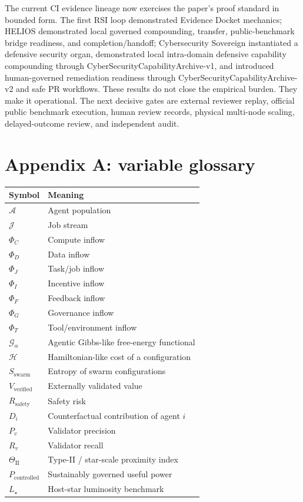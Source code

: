 The current CI evidence lineage now exercises the paper's proof standard
in bounded form. The first RSI loop demonstrated Evidence Docket
mechanics; HELIOS demonstrated local governed compounding, transfer,
public-benchmark bridge readiness, and completion/handoff; Cybersecurity
Sovereign instantiated a defensive security organ, demonstrated local
intra-domain defensive capability compounding through
CyberSecurityCapabilityArchive-v1, and introduced human-governed
remediation readiness through CyberSecurityCapabilityArchive-v2 and safe
PR workflows. These results do not close the empirical burden. They make
it operational. The next decisive gates are external reviewer replay,
official public benchmark execution, human review records, physical
multi-node scaling, delayed-outcome review, and independent audit.

\section{Appendix A: variable
glossary}\label{appendix-a-variable-glossary}

\begin{longtable}[]{@{}ll@{}}
\toprule\noalign{}
Symbol & Meaning \\
\midrule\noalign{}
\endhead
\bottomrule\noalign{}
\endlastfoot
\(\mathcal{A}\) & Agent population \\
\(\mathcal{J}\) & Job stream \\
\(\Phi_C\) & Compute inflow \\
\(\Phi_D\) & Data inflow \\
\(\Phi_J\) & Task/job inflow \\
\(\Phi_I\) & Incentive inflow \\
\(\Phi_F\) & Feedback inflow \\
\(\Phi_G\) & Governance inflow \\
\(\Phi_T\) & Tool/environment inflow \\
\(\mathcal{G}_{\alpha}\) & Agentic Gibbs-like free-energy functional \\
\(\mathcal{H}\) & Hamiltonian-like cost of a configuration \\
\(S_{\text{swarm}}\) & Entropy of swarm configurations \\
\(V_{\text{verified}}\) & Externally validated value \\
\(R_{\text{safety}}\) & Safety risk \\
\(D_i\) & Counterfactual contribution of agent \(i\) \\
\(P_v\) & Validator precision \\
\(R_v\) & Validator recall \\
\(\Theta_{\mathrm{II}}\) & Type-II / star-scale proximity index \\
\(P_{\text{controlled}}\) & Sustainably governed useful power \\
\(L_{\star}\) & Host-star luminosity benchmark \\
\end{longtable}


